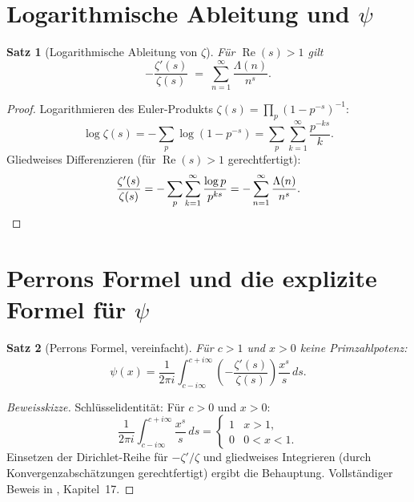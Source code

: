 \documentclass[12pt,a4paper]{amsart}
\newtheorem{theorem}{Satz}[section]
\theoremstyle{definition}
\DeclareMathOperator{\Re}{Re}
\begin{document}
\section{Logarithmische Ableitung und \texorpdfstring{$\psi$}{psi}}

\begin{theorem}[Logarithmische Ableitung von $\zeta$]
\label{thm:log_deriv}
F\"ur $\Re(s) > 1$ gilt
\[
  -\frac{\zeta'(s)}{\zeta(s)} \;=\; \sum_{n=1}^{\infty} \frac{\Lambda(n)}{n^s}.
\]
\end{theorem}

\begin{proof}
Logarithmieren des Euler-Produkts $\zeta(s) = \prod_p (1-p^{-s})^{-1}$:
\[
  \log\zeta(s) = -\sum_p \log(1 - p^{-s}) = \sum_p \sum_{k=1}^{\infty} \frac{p^{-ks}}{k}.
\]
Gliedweises Differenzieren (f\"ur $\Re(s)>1$ gerechtfertigt):
\[
  \frac{\zeta'(s)}{\zeta(s)} = -\sum_p \sum_{k=1}^{\infty} \frac{\log p}{p^{ks}}
  = -\sum_{n=1}^{\infty} \frac{\Lambda(n)}{n^s}. \qedhere
\]
\end{proof}

\section{Perrons Formel und die explizite Formel f\"ur \texorpdfstring{$\psi$}{psi}}

\begin{theorem}[Perrons Formel, vereinfacht]
\label{thm:perron}
F\"ur $c > 1$ und $x > 0$ keine Primzahlpotenz:
\[
  \psi(x) = \frac{1}{2\pi i} \int_{c-i\infty}^{c+i\infty}
  \left(-\frac{\zeta'(s)}{\zeta(s)}\right) \frac{x^s}{s}\,ds.
\]
\end{theorem}

\begin{proof}[Beweisskizze]
Schl\"usselidentit\"at: F\"ur $c > 0$ und $x > 0$:
\[
  \frac{1}{2\pi i} \int_{c-i\infty}^{c+i\infty} \frac{x^s}{s}\,ds
  = \begin{cases} 1 & x > 1, \\ 0 & 0 < x < 1. \end{cases}
\]
Einsetzen der Dirichlet-Reihe f\"ur $-\zeta'/\zeta$ und gliedweises Integrieren
(durch Konvergenzabsch\"atzungen gerechtfertigt) ergibt die Behauptung.
Vollst\"andiger Beweis in \cite{Davenport2000}, Kapitel~17.
\end{proof}
\end{document}
